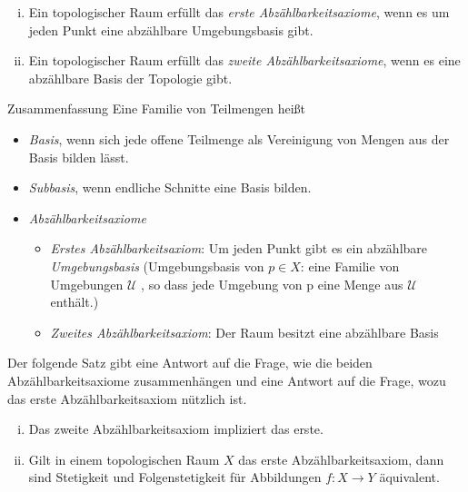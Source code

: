 \documentclass[a4paper,10pt]{scrartcl}
\begin{document}
\begin{df}
 \begin{enumerate}[(i)]
  \item Ein topologischer Raum erfüllt das \emph{erste Abzählbarkeitsaxiome}, wenn es um jeden Punkt eine abzählbare Umgebungsbasis gibt. 
\item Ein topologischer Raum erfüllt das \emph{zweite Abzählbarkeitsaxiome}, wenn es eine abzählbare Basis der Topologie gibt.
 \end{enumerate}
\end{df}
\begin{seg}{Zusammenfassung}
Eine Familie von Teilmengen heißt
\begin{itemize}
 \item \emph{Basis}, wenn sich jede offene Teilmenge als Vereinigung von Mengen aus der Basis bilden lässt.
 \item \emph{Subbasis}, wenn endliche Schnitte eine Basis bilden.
 \item \emph{Abzählbarkeitsaxiome}
 \begin{itemize}
\item \emph{Erstes Abzählbarkeitsaxiom}: Um jeden Punkt gibt es ein abzählbare \emph{Umgebungsbasis} (Umgebungsbasis von $p\in X$: eine Familie von Umgebungen $\mathcal U$
, so dass jede Umgebung von p eine Menge aus $\mathcal U$ enthält.)
\item \emph{Zweites Abzählbarkeitsaxiom}: Der Raum besitzt eine abzählbare Basis
\end{itemize}
\end{itemize}
\end{seg}
Der folgende Satz gibt eine Antwort auf die Frage, wie die beiden Abzählbarkeitsaxiome zusammenhängen und eine Antwort auf die Frage, wozu das erste Abzählbarkeitsaxiom nützlich ist.
\begin{st}\label{thm:5.6}
 \begin{enumerate}[(i)]
  \item Das zweite Abzählbarkeitsaxiom impliziert das erste.
  \item Gilt in einem topologischen Raum $X$ das erste Abzählbarkeitsaxiom, dann sind Stetigkeit und Folgenstetigkeit für Abbildungen $f:X\to Y$ äquivalent.
 \end{enumerate}
\end{st}
\end{document}
